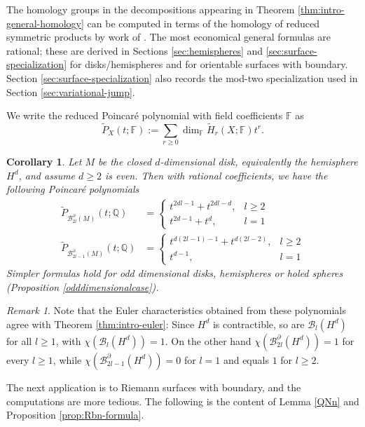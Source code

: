 \documentclass[11pt,a4paper]{article}
\numberwithin{equation}{section}
\newtheorem{cor}[thm]{Corollary}
\theoremstyle{definition}
\theoremstyle{remark}
\newtheorem{rem}[thm]{Remark}
\newcommand{\F}{\mathbb{F}}
\newcommand{\Q}{\mathbb{Q}}
\newcommand{\pa}{\partial}
\newcommand{\ch}{\chi}
\newcommand{\wt}{\widetilde}
\newcommand{\BB}{\mathcal B}
\begin{document}
The homology groups in the decompositions appearing in Theorem \ref{thm:intro-general-homology} can be computed in terms of the homology of reduced symmetric products by work of \cite{KallelKaroui2011}. The most economical general formulas are rational; these are derived in Sections \ref{sec:hemispheres} and \ref{sec:surface-specialization} for disks/hemispheres and for orientable surfaces with boundary. Section \ref{sec:surface-specialization} also records the mod-two specialization used in Section \ref{sec:variational-jump}.

We write the reduced Poincar\'e polynomial with field coefficients $\F$ as
$$\displaystyle 
\wt P_X(t;\F):=\sum_{r\ge0}\dim_{\F}\wt H_r(X;\F)t^r.$$

\begin{cor}\label{closeddisks} Let \(M\) be the closed $d$-dimensional disk, equivalently the hemisphere $H^d$, and assume $d\ge2$ is even. Then
with rational coefficients, we have the following Poincar\'e polynomials
\begin{align*}
\wt P_{\BB_{2l}^{\pa}(M)}(t;\Q)
&=
\begin{cases}
t^{2dl-1}+t^{2dl-d},&l\ge2\\
t^{2d-1}+t^{d},&l=1
\end{cases}\\
\wt P_{\BB_{2l-1}^{\pa}(M)}(t;\Q)
&=
\begin{cases}
t^{d(2l-1)-1}+t^{d(2l-2)},&l\ge2\\
t^{d-1},&l=1
\end{cases}
\end{align*}
Simpler formulas hold for odd dimensional disks, hemispheres or holed spheres (Proposition \ref{odddimensionalcase}).
\end{cor}

\begin{rem}\rm Note that the Euler characteristics obtained from these polynomials agree with Theorem \ref{thm:intro-euler}: Since $H^d$ is contractible, so are $\BB_l(H^d)$ for all $l\ge 1$, with $\chi (\BB_l(H^d))=1$. On the other hand \(\ch(\BB_{2l}^{\pa}(H^{d}))=1\) for every \(l\ge1\), while \(\ch(\BB_{2l-1}^{\pa}(H^{d}))=0\) for \(l=1\) and equals \(1\) for \(l\ge2\).
\end{rem}

The next application is to Riemann surfaces with boundary, and the computations are more tedious. The following is the content of Lemma \ref{QNn} and Proposition \ref{prop:Rbn-formula}. 
\end{document}
